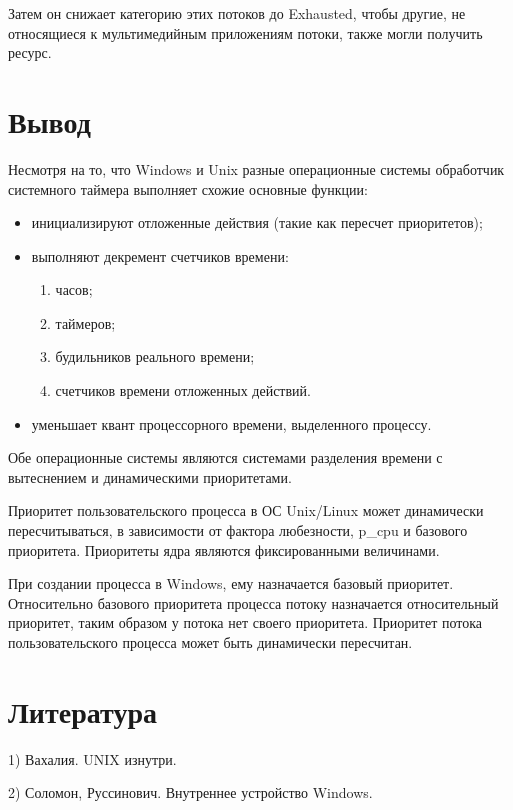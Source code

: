 Затем он снижает категорию этих потоков до Exhausted,
чтобы другие, не относящиеся к мультимедийным
приложениям потоки, также могли получить ресурс.

\newpage

\section{Вывод}

Несмотря на то, что Windows и Unix разные операционные системы
обработчик системного таймера выполняет
схожие основные функции:

\begin{itemize}
	\item инициализируют отложенные действия (такие как пересчет приоритетов);
	\item выполняют декремент счетчиков времени:
	\begin{enumerate}
		\item часов;
		\item таймеров;
		\item будильников реального времени;
		\item счетчиков времени отложенных действий.
	\end{enumerate}
	 \item уменьшает квант процессорного времени, выделенного процессу.
\end{itemize}

Обе операционные системы являются системами
разделения времени с вытеснением и динамическими приоритетами.

Приоритет пользовательского процесса в ОС Unix/Linux
может динамически пересчитываться, в зависимости от
фактора любезности, p\_cpu и базового приоритета. 
Приоритеты ядра являются фиксированными величинами.

При создании процесса в Windows, ему назначается базовый приоритет. 
Относительно базового приоритета процесса потоку назначается
относительный приоритет, таким образом у потока нет своего приоритета.
Приоритет потока пользовательского процесса может быть динамически пересчитан.

\newpage
\section{Литература}

1) Вахалия. UNIX изнутри.

2) Соломон, Руссинович. Внутреннее устройство Windows.
